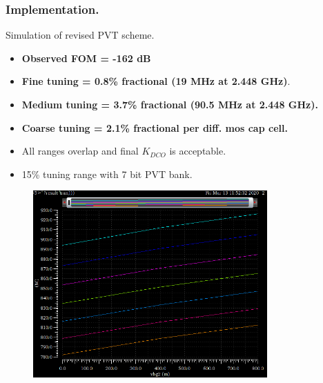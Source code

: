 \documentclass[t, screen, aspectratio=43]{beamer}
\begin{document}
\begin{frame}
	\frametitle{Implementation.}
	\begin{block}{Simulation of revised PVT scheme.}
				\vspace{2em}
		\begin{minipage}{4cm}
			\tiny

			\begin{itemize}[itemsep=4pt,label=\protect---]
				\item \textbf{\color{red}Observed FOM = -162 dB}
				\item \textbf{Fine tuning = 0.8\% fractional (19 MHz at 2.448 GHz)}.
				\item \textbf{Medium tuning = 3.7\% fractional (90.5 MHz at 2.448 GHz).}
				\item \textbf{Coarse tuning = 2.1\% fractional per diff. mos cap cell.}
				\item All ranges overlap and final $K_{DCO}$ is acceptable.
				\item 15\% tuning range with 7 bit PVT bank. 
			\end{itemize}

		\end{minipage}%
		\begin{minipage}{8cm}
			\begin{figure}[htb!]
			        \centering
			        \includegraphics[width=0.8\textwidth, angle=0]{./coarse_med_tune}
			\end{figure}
		\end{minipage}%

	\end{block}	
\end{frame}
\end{document}
